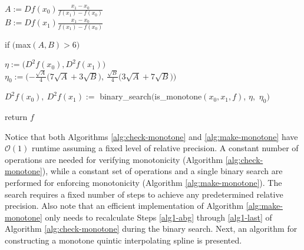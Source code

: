 \documentclass{scspaperproc}
\theoremstyle{scsthe}
\begin{document}
{    \item {} \label{alg2-ddx0-upper}
    \item  {} \label{alg2-gamma}
    \item {} \label{alg2-alpha}
    \item  {} \label{alg2-beta}
    \item
    \item $\displaystyle A := Df(x_0)\frac{x_1 - x_0}{f(x_1) - f(x_0)}$
      \\ $\displaystyle B := Df(x_1) \frac{x_1 - x_0}{f(x_1) - f(x_0)}$
    \item if $\big($max$(A,B) > 6\big)$
    \item $\eta := \big(D^2f(x_0), D^2f(x_1)\big)$
      \\ $\displaystyle \eta_0 := \bigg({-\frac{\sqrt{A}}{4}}\big(7\sqrt{A} + 3\sqrt{B}\big),\ \frac{\sqrt{B}}{4}\big(3\sqrt{A} + 7\sqrt{B}\big)  \bigg)$
    \item $D^2f(x_0),\ D^2f(x_1) := $ binary\_search$\big($is\_monotone$(x_0,x_1,f)$, $\eta,$ $\eta_0\big)$
    \item return $f$
}


Notice that both Algorithms \ref{alg:check-monotone} and \ref{alg:make-monotone} have $\mathcal{O}(1)$ runtime  assuming a fixed level of relative precision. A constant number of operations are needed for verifying monotonicity (Algorithm \ref{alg:check-monotone}), while a constant set of operations and a single binary search are performed for enforcing monotonicity (Algorithm \ref{alg:make-monotone}). The search requires a fixed number of steps to achieve any predetermined relative precision. Also note that an efficient implementation of Algorithm \ref{alg:make-monotone} only needs to recalculate Steps \ref{alg1-abg} through \ref{alg1-last} of Algorithm \ref{alg:check-monotone} during the binary search. Next, an algorithm for constructing a monotone quintic interpolating spline is presented.
\end{document}
